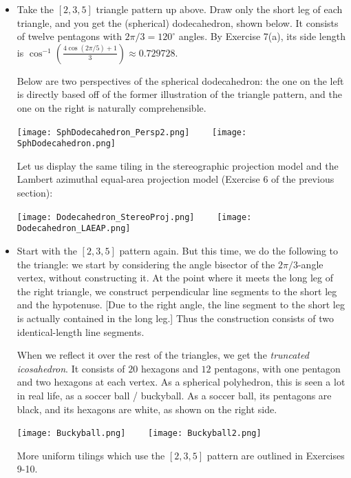 \documentclass[leqno]{book}
\begin{document}
\begin{itemize}
\item Take the $[2,3,5]$ triangle pattern up above.  Draw only the short leg of each triangle, and you get the (spherical) dodecahedron, shown below.  It consists of twelve pentagons with $2\pi/3=120^\circ$ angles.  By Exercise 7(a), its side length is $\cos^{-1}\left(\frac{4\cos(2\pi/5)+1}{3}\right)\approx 0.729728$.

Below are two perspectives of the spherical dodecahedron: the one on the left is directly based off of the former illustration of the triangle pattern, and the one on the right is naturally comprehensible.
\begin{center}
\texttt{[image: SphDodecahedron\_Persp2.png]}~~~~
\texttt{[image: SphDodecahedron.png]} %
\end{center}
Let us display the same tiling in the stereographic projection model and the Lambert azimuthal equal-area projection model (Exercise 6 of the previous section):
\begin{center}
\texttt{[image: Dodecahedron\_StereoProj.png]}~~~~
\texttt{[image: Dodecahedron\_LAEAP.png]}
\end{center}
\item Start with the $[2,3,5]$ pattern again.  But this time, we do the following to the triangle: we start by considering the angle bisector of the $2\pi/3$-angle vertex, without constructing it.  At the point where it meets the long leg of the right triangle, we construct perpendicular line segments to the short leg and the hypotenuse.  [Due to the right angle, the line segment to the short leg is actually contained in the long leg.]  Thus the construction consists of two identical-length line segments.

When we reflect it over the rest of the triangles, we get the \emph{truncated icosahedron}.  It consists of $20$ hexagons and $12$ pentagons, with one pentagon and two hexagons at each vertex.  As a spherical polyhedron, this is seen a lot in real life, as a soccer ball / buckyball.  As a soccer ball, its pentagons are black, and its hexagons are white, as shown on the right side.
\begin{center}
\texttt{[image: Buckyball.png]}~~~~
\texttt{[image: Buckyball2.png]}
\end{center}
More uniform tilings which use the $[2,3,5]$ pattern are outlined in Exercises 9-10.


\end{itemize}
\end{document}
